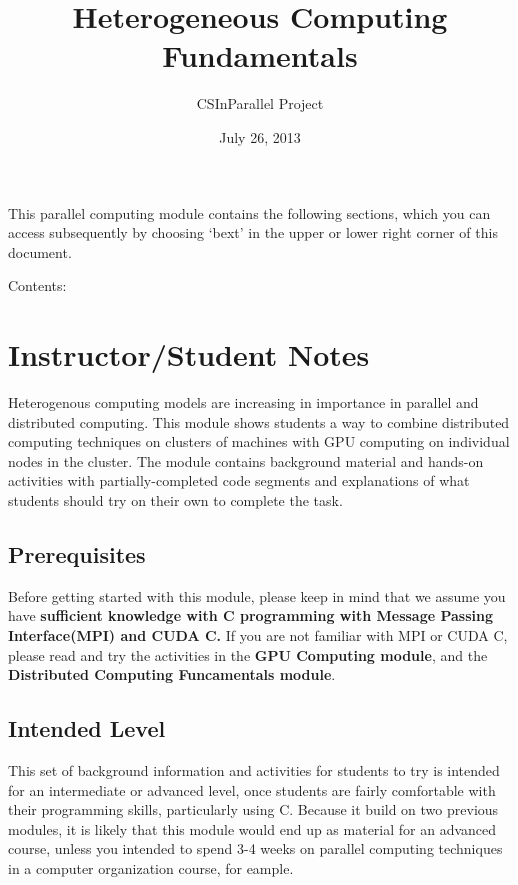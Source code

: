 \documentclass[letterpaper,10pt,openany,oneside]{sphinxmanual}
\title{Heterogeneous Computing Fundamentals}
\date{July 26, 2013}
\author{CSInParallel Project}
\begin{document}
\maketitle
\tableofcontents
{}\label{index::doc}


This parallel computing module contains the following sections, which
you can access subsequently by choosing `bext' in the upper or lower right
corner of this document.

Contents:


\chapter{Instructor/Student Notes}
\label{Prerequisites/Prerequisites:heterogeneous-computing-fundamentals}\label{Prerequisites/Prerequisites:instructor-student-notes}\label{Prerequisites/Prerequisites::doc}
Heterogenous computing models are increasing in importance in parallel and distributed computing.
This module shows students a way to combine distributed computing techniques on clusters of machines with GPU computing on individual nodes in the cluster.  The module contains background material and hands-on activities with partially-completed code segments and explanations of what students should try on their own to complete the task.


\section{Prerequisites}
\label{Prerequisites/Prerequisites:prerequisites}
Before getting started with this module, please keep in mind that we assume you have \textbf{sufficient knowledge with C programming with Message Passing Interface(MPI) and CUDA C.} If you are not familiar with MPI or CUDA C, please read and try the activities in the \textbf{GPU Computing module}, and the \textbf{Distributed Computing Funcamentals module}.


\section{Intended Level}
\label{Prerequisites/Prerequisites:intended-level}
This set of background information and activities for students to try is intended for an intermediate or advanced level, once students are fairly comfortable with their programming skills, particularly using C.  Because it build on two previous modules, it is likely that this module would end up as material for an advanced course, unless you intended to spend 3-4 weeks on parallel computing techniques in a computer organization course, for eample.
\end{document}
